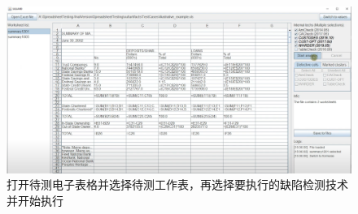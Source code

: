 \begin{figure}[tp]    
    \centering
    \includegraphics[width=\textwidth]{figure/sg/sguard-4.png}
    \caption{打开待测电子表格并选择待测工作表，再选择要执行的缺陷检测技术并开始执行}
    \label{figure-sg4}
\end{figure}